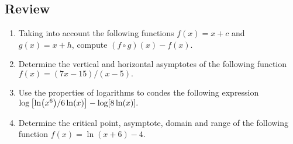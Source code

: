 \documentclass[../main-exe.tex]{subfiles}
\begin{document}
\subsection{Review}
\begin{enumerate}
    \item Taking into account the following functions $f(x)=x+c$ and $g(x)=x+h$, compute $(f\circ g)(x) - f(x)$.
    \item Determine the vertical and horizontal asymptotes of the following function $f(x)=(7x-15)/(x-5).$
    \item Use the properties of logarithms to condes the following expression $\log\qty[\ln(x^6)/6\ln(x)]-\log[8\ln(x)].$
    \item Determine the critical point, asymptote, domain and range of the following function $f(x)=\ln(x+6)-4$.
\end{enumerate}
\end{document}

